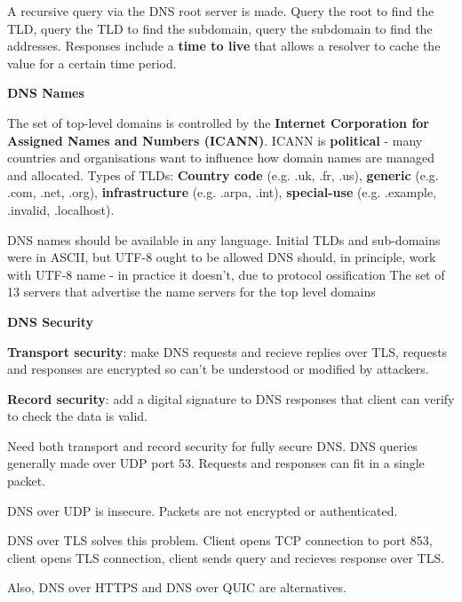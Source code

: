 \documentclass{article}
\begin{document}
A recursive query via the DNS root server is made. Query the root to find the TLD, query the TLD to find the subdomain,
query the subdomain to find the addresses.
Responses include a \textbf{time to live} that allows a resolver to cache the value for a certain time period.

\vspace{\baselineskip}
\textbf{DNS Names}

The set of top-level domains is controlled by the \textbf{Internet Corporation for Assigned Names and Numbers (ICANN)}.
ICANN is \textbf{political} {-} many countries and organisations want to influence how domain names are managed and allocated.
Types of TLDs:
\textbf{Country code} (e.g. {.}uk, {.}fr, {.}us),
\textbf{generic} (e.g. {.}com, {.}net, {.}org),
\textbf{infrastructure} (e.g. {.}arpa, {.}int),
\textbf{special-use} (e.g. {.}example, {.}invalid, {.}localhost).

DNS names should be available in any language. Initial TLDs and sub-domains were in ASCII, but UTF-8 ought to be allowed
DNS should, in principle, work with UTF-8 name {-} in practice it doesn't, due to protocol ossification
The set of 13 servers that advertise the name servers for the top level domains

\vspace{\baselineskip}
\textbf{DNS Security}

\textbf{Transport security}: make DNS requests and recieve replies over TLS, requests and responses are encrypted so can't be understood or modified by attackers.

\textbf{Record security}: add a digital signature to DNS responses that client can verify to check the data is valid.

Need both transport and record security for fully secure DNS\@.
DNS queries generally made over UDP port 53. Requests and responses can fit in a single packet.

DNS over UDP is insecure. Packets are not encrypted or authenticated.

DNS over TLS solves this problem. Client opens TCP connection to port 853, client opens TLS connection,
client sends query and recieves response over TLS\@.

Also, DNS over HTTPS and DNS over QUIC are alternatives.
\end{document}
